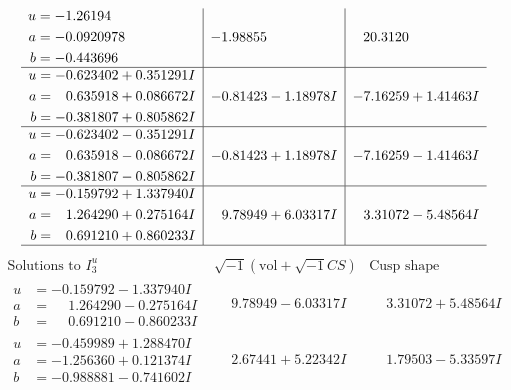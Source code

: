 \documentclass[1p]{elsarticle_modified}
\theoremstyle{definition}
\newcommand{\I}{\sqrt{-1}}
\begin{document}
$$\begin{array}{c|c|c}
\begin{aligned}
u &= -1.26194\phantom{ +0.000000I} \\
a &= -0.0920978\phantom{ +0.000000I} \\
b &= -0.443696\phantom{ +0.000000I}\end{aligned}
 & -1.98855\phantom{ +0.000000I} & \phantom{-}20.3120\phantom{ +0.000000I} \\ \hline\begin{aligned}
u &= -0.623402 + 0.351291 I \\
a &= \phantom{-}0.635918 + 0.086672 I \\
b &= -0.381807 + 0.805862 I\end{aligned}
 & -0.81423 - 1.18978 I & -7.16259 + 1.41463 I \\ \hline\begin{aligned}
u &= -0.623402 - 0.351291 I \\
a &= \phantom{-}0.635918 - 0.086672 I \\
b &= -0.381807 - 0.805862 I\end{aligned}
 & -0.81423 + 1.18978 I & -7.16259 - 1.41463 I \\ \hline\begin{aligned}
u &= -0.159792 + 1.337940 I \\
a &= \phantom{-}1.264290 + 0.275164 I \\
b &= \phantom{-}0.691210 + 0.860233 I\end{aligned}
 & \phantom{-}9.78949 + 6.03317 I & \phantom{-}3.31072 - 5.48564 I\\
 \hline 
 \end{array}$$\newpage$$\begin{array}{c|c|c}  
\text{Solutions to }I^u_{3}& \I (\text{vol} + \sqrt{-1}CS) & \text{Cusp shape}\\
 \hline 
\begin{aligned}
u &= -0.159792 - 1.337940 I \\
a &= \phantom{-}1.264290 - 0.275164 I \\
b &= \phantom{-}0.691210 - 0.860233 I\end{aligned}
 & \phantom{-}9.78949 - 6.03317 I & \phantom{-}3.31072 + 5.48564 I \\ \hline\begin{aligned}
u &= -0.459989 + 1.288470 I \\
a &= -1.256360 + 0.121374 I \\
b &= -0.988881 - 0.741602 I\end{aligned}
 & \phantom{-}2.67441 + 5.22342 I & \phantom{-}1.79503 - 5.33597 I \\ \hline\begin{aligned}

\end{aligned}
\end{array}$$
\end{document}
